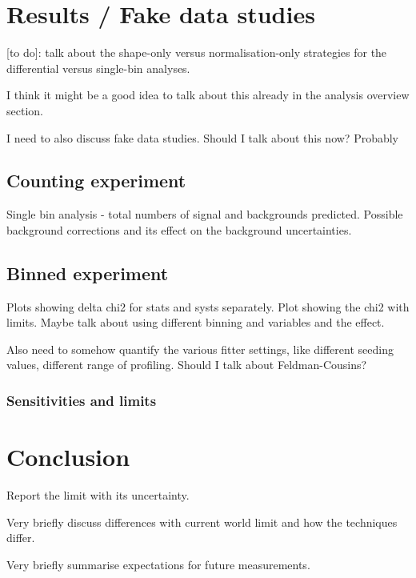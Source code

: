 \documentclass[12pt]{article}
\begin{document}
\section{Results / Fake data studies}
[to do]: talk about the shape-only versus normalisation-only strategies for the differential versus single-bin analyses.

I think it might be a good idea to talk about this already in the analysis overview section.

I need to also discuss fake data studies. Should I talk about this now? Probably

\subsection{Counting experiment}
Single bin analysis - total numbers of signal and backgrounds predicted. Possible background corrections and its effect on the background uncertainties. 

\subsection{Binned experiment}
Plots showing delta chi2 for stats and systs separately. Plot showing the chi2 with limits. Maybe talk about using different binning and variables and the effect.

Also need to somehow quantify the various fitter settings, like different seeding values, different range of profiling. Should I talk about Feldman-Cousins? 

\subsubsection{Sensitivities and limits}

\section{Conclusion}
Report the limit with its uncertainty.

Very briefly discuss differences with current world limit and how the techniques differ.

Very briefly summarise expectations for future measurements.



\end{document}
